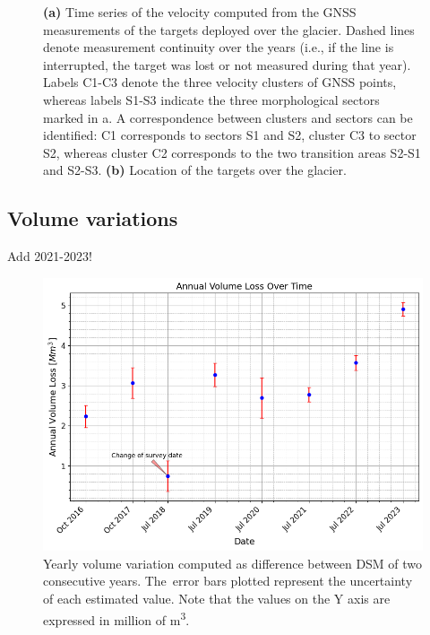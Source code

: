 \begin{figure}
    \caption{\textbf{(a)} Time series of the velocity computed from the GNSS measurements of the targets deployed over the glacier. Dashed lines denote measurement continuity over the years (i.e., if the line is interrupted, the target was lost or not measured during that year). Labels C1-C3 denote the three velocity clusters of GNSS points, whereas labels S1-S3 indicate the three morphological sectors marked in a. A correspondence between clusters and sectors can be identified: C1 corresponds to sectors S1 and S2, cluster C3 to sector S2, whereas cluster C2 corresponds to the two transition areas S2-S1 and S2-S3. \textbf{(b)} Location of the targets over the glacier.}
    \label{fig:3:GNSS_velocity}		
\end{figure}

\subsection{Volume variations}\label{sec:3:res:volumes}

{\color{red} Add 2021-2023!}

\begin{figure}
    \centering
    \includegraphics[width=0.8\columnwidth]{volume_loss_2015-2023.png}
    \caption{Yearly volume variation computed as difference between DSM of two
        consecutive years. The~error bars plotted represent the uncertainty of each
        estimated value. Note that the values on the Y axis are expressed in million of
        \si{\cubic\meter}.}
    \label{fig:3:volumes}
\end{figure}

